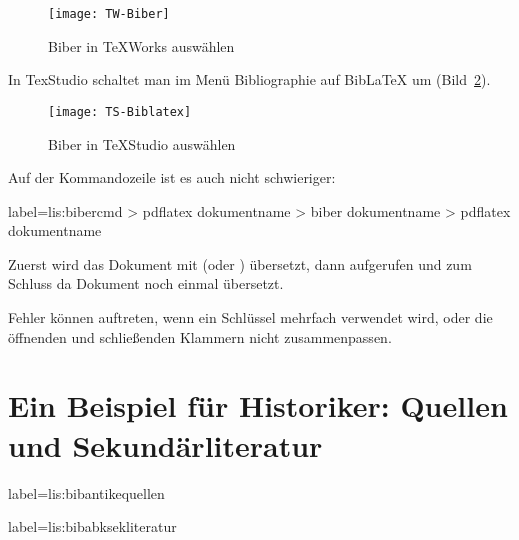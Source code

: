 \begin{figure}
  \texttt{[image: TW-Biber]}
  \caption{Biber in TeXWorks auswählen}
  \label{fig:lis:TWbiber}
\end{figure}

In TexStudio schaltet man im Menü Bibliographie auf BibLaTeX um (Bild~\ref{fig:lis:TSbiblatex}).

\begin{figure}
  \texttt{[image: TS-Biblatex]}
  \caption{Biber in TeXStudio auswählen}
  \label{fig:lis:TSbiblatex}
\end{figure}

Auf der Kommandozeile ist es auch nicht schwieriger:

\begin{lfgwcode}{label={lis:bibercmd}}
> pdflatex dokumentname
> biber dokumentname
> pdflatex dokumentname
\end{lfgwcode}

Zuerst wird das Dokument mit  (oder ) übersetzt,
dann  aufgerufen und zum Schluss da Dokument noch einmal übersetzt.

Fehler können auftreten, wenn ein Schlüssel mehrfach verwendet wird, 
oder die öffnenden und schließenden Klammern nicht zusammenpassen.

\section{Ein Beispiel für Historiker: Quellen und Sekundärliteratur}\label{sec:bibliografie}




\begin{lfgwcode}{label={lis:bibantikequellen}}
\printbibliography[%
  heading=subbibliography,
  keyword=ancient,%
  title={Antike Quellen}]
\end{lfgwcode}

\begin{lfgwcode}{label={lis:bibabksekliteratur}}
\printbibliography[%
  heading=subbibliography,
  keyword=corpus,%
  title={Abkürzungen und Sigel}]

\printbibliography[%
  heading=subbibliography,
  notkeyword=ancient,%
  notkeyword=corpus,%
  title={Sekundärliteratur}]
\end{lfgwcode}

